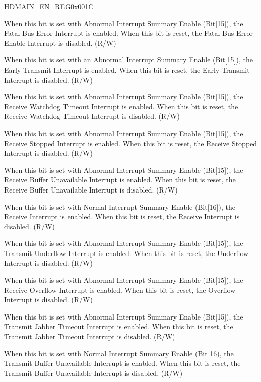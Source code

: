 \addtocounter{Regfloat}{-1}
\begin{register}{H}{DMAIN\_EN\_REG}{0x001C}
\begin{regdesc}\begin{reglist}
\item [Continued from the previous page...]
\item [DMAIN\_FBEE]When this bit is set with Abnormal Interrupt Summary Enable (Bit[15]), the Fatal Bus Error Interrupt is enabled. When this bit is reset, the Fatal Bus Error Enable Interrupt is disabled. (R/W)
\item [DMAIN\_ETIE]When this bit is set with an Abnormal Interrupt Summary Enable (Bit[15]), the Early Transmit Interrupt is enabled. When this bit is reset, the Early Transmit Interrupt is disabled. (R/W)
\item [DMAIN\_RWTE]When this bit is set with Abnormal Interrupt Summary Enable (Bit[15]), the Receive Watchdog Timeout Interrupt is enabled. When this bit is reset, the Receive Watchdog Timeout Interrupt is disabled. (R/W)
\item [DMAIN\_RSE]When this bit is set with Abnormal Interrupt Summary Enable (Bit[15]), the Receive Stopped Interrupt is enabled. When this bit is reset, the Receive Stopped Interrupt is disabled. (R/W)
\item [DMAIN\_RBUE]When this bit is set with Abnormal Interrupt Summary Enable (Bit[15]), the Receive Buffer Unavailable Interrupt is enabled. When this bit is reset, the Receive Buffer Unavailable Interrupt is disabled. (R/W)
\item [DMAIN\_RIE]When this bit is set with Normal Interrupt Summary Enable (Bit[16]), the Receive Interrupt is enabled. When this bit is reset, the Receive Interrupt is disabled. (R/W)
\item [DMAIN\_UIE]When this bit is set with Abnormal Interrupt Summary Enable (Bit[15]), the Transmit Underflow Interrupt is enabled. When this bit is reset, the Underflow Interrupt is disabled. (R/W)
\item [DMAIN\_OIE]When this bit is set with Abnormal Interrupt Summary Enable (Bit[15]), the Receive Overflow Interrupt is enabled. When this bit is reset, the Overflow Interrupt is disabled. (R/W)
\item [DMAIN\_TJTE]When this bit is set with Abnormal Interrupt Summary Enable (Bit[15]), the Transmit Jabber Timeout Interrupt is enabled. When this bit is reset, the Transmit Jabber Timeout Interrupt is disabled. (R/W)
\item [DMAIN\_TBUE]When this bit is set with Normal Interrupt Summary Enable (Bit 16), the Transmit Buffer Unavailable Interrupt is enabled. When this bit is reset, the Transmit Buffer Unavailable Interrupt is disabled. (R/W)

\end{reglist}
\end{regdesc}
\end{register}

